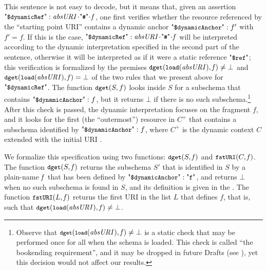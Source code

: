 This sentence is not easy to decode, but it means that, given an assertion
$\qddref: \key{absURI}\catHash\key{f}$, 
one first verifies whether the resource referenced by the ``starting point URI''  contains a
dynamic anchor $\qdda: f'$ with $f'=f$.
If this is the case, $\qddref: \key{absURI}\catHash\key{f}$ will
be interpreted according to the dynamic interpretation specified in the second part of the sentence,
otherwise it will be interpreted as if it were a static reference ${\qdref}$; this verification is formalized
by the premises $\mbox{\tt{\small dget}}(\mbox{\tt{\small load}}(\mathit{absURI}),\mathit{f}) \neq \bot$ and
$\mbox{\tt{\small dget}}(\mbox{\tt{\small load}}(\mathit{absURI}),\mathit{f}) = \bot$ of the two rules that we present above for 
$\qddref$. The function $\mbox{\tt{\small dget}}(S,f)$  looks inside $S$ for a subschema that contains $\qdda: f$,
but it returns $\bot$ if there is no such subschema.\footnote{%
Observe that $\mbox{\tt{\small \footnotesize dget}}(\mbox{\tt{\small \footnotesize load}}(\mathit{absURI}),\mathit{f}) \neq \bot$ is a static check that may be performed 
once for all when the schema is loaded.
This check is called ``the bookending requirement'', and it may be dropped 
in future Drafts (see
),
yet this decision would not affect our results.}
After this check is passed, the dynamic interpretation focuses on the fragment $f$, and it looks 
for the first (the ``outermost'') resource in $C^+$ that contains a subschema identified by $\qdda: f$,
where $C^+$ is the dynamic context $C$ extended with the initial URI .
%





We formalize this specification using two functions: $\mbox{\tt{\small dget}}(S,\mathit{f})$ and
$\mbox{\tt{\small fstURI}}(C,\mathit{f})$.
The function $\mbox{\tt{\small dget}}(S,\mathit{f})$ returns the subschema $S'$ that is identified in $S$ by a plain-name $\mathit{f}$
that has been defined by $\qdda: \qkw{f}$, and returns
$\bot$ when no such subschema is found in $S$, and its definition is given in the {\FV}.
The function $\mbox{\tt{\small fstURI}}(L,\mathit{f})$ returns the first URI in the list $L$ that defines $f$, that is, such that
$\mbox{\tt{\small dget}}(\mbox{\tt{\small load}}(\mathit{absURI}),\mathit{f}) \neq \bot$.%

